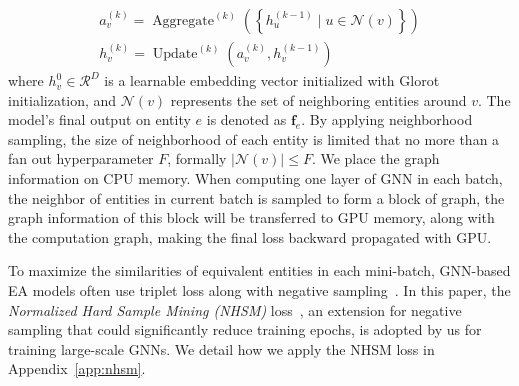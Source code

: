 \vspace{-3mm}
\begin{equation}
\begin{array}{c}
a_{v}^{(k)}=\operatorname{Aggregate}^{(k)}(\left\{h_{u}^{(k-1)} \mid u \in \mathcal{N}(v)\right\}) \\
h_{v}^{(k)}=\operatorname{Update}^{(k)}(a_{v}^{(k)}, h_{v}^{(k-1)})
\end{array}
\label{eq:message_passing}
\end{equation}
where $h_v^0 \in \mathcal{R}^D$ is a learnable embedding vector initialized with Glorot initialization, and 
$\mathcal{N}(v)$ represents the set of neighboring entities around $v$. The model's final output on entity $e$ is denoted as $\mathbf{f}_e$. By applying neighborhood sampling, the size of neighborhood of each entity is limited that no more than a fan out hyperparameter $F$, formally $|\mathcal{N}(v)|\leq F$. We place the graph information on CPU memory. When computing one layer of GNN in each batch, the neighbor of entities in current batch is sampled to form a block of graph, the graph information of this block will be transferred to GPU memory, along with the computation graph, making the final loss backward propagated with GPU.

To maximize the similarities of equivalent entities in each mini-batch, GNN-based EA models often use triplet loss along with negative sampling~\cite{GCN-Align18, KECG19, RREA20, MRAEA20}. In this paper, the \emph{Normalized Hard Sample Mining (NHSM)} loss~\cite{DualAMN21}, an extension for negative sampling that could significantly reduce training epochs, is adopted by us for training large-scale GNNs. We detail how we apply the NHSM loss in Appendix~\ref{app:nhsm}.


